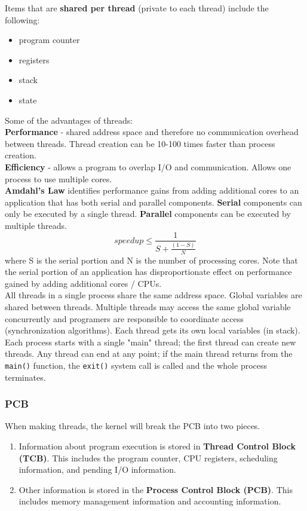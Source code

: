 \documentclass{article}
\renewcommand{\b}{\item[$\circ$]}
\newcommand{\newlist}{\begin{itemize}}
\renewcommand{\endlist}{\end{itemize}}
\begin{document}
    \noindent Items that are \textbf{shared per thread} (private to each thread) include the following:

    \newlist
    \b program counter
    \b registers 
    \b stack
    \b state
    \endlist
    
    \noindent Some of the advantages of threads:  \\
    \textbf{Performance} - shared address space and therefore no communication overhead between threads. Thread creation can be 10-100 times faster than process creation. \\
    \textbf{Efficiency} - allows a program to overlap I/O and communication. Allows one process to use multiple cores. \\

    \noindent \textbf{Amdahl's Law} identifies performance gains from adding additional cores to an application that has both serial and parallel components. \textbf{Serial} components can only be executed by a single thread. \textbf{Parallel} components can be executed by multiple threads. 
    $$speedup \leq \frac{1}{S + \frac{(1-S)}{N}}$$
    where S is the serial portion and N is the number of processing cores. Note that the serial portion of an application has disproportionate effect on performance gained by adding additional cores / CPUs. \\

    All threads in a single process share the same address space. Global variables are shared between threads. Multiple threads may access the same global variable concurrently and programers are responsible to coordinate access (synchronization algorithms). Each thread gets its own local variables (in stack). Each process starts with a single "main" thread; the first thread can create new threads. Any thread can end at any point; if the main thread returns from the \texttt{main()} function, the \texttt{exit()} system call is called and the whole process terminates. \\
    
    \subsubsection{PCB}

    When making threads, the kernel will break the PCB into two pieces.

    \begin{enumerate}
    \b Information about program execution is stored in \textbf{Thread Control Block (TCB)}. This includes the program counter, CPU registers, scheduling information, and pending I/O information. 
    \b Other information is stored in the \textbf{Process Control Block (PCB)}. This includes memory management information and accounting information. 
    \end{enumerate}
\end{document}
